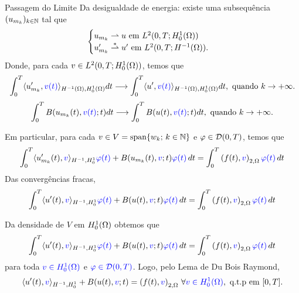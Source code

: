 \begin{frame}{Passagem do Limite}
Da desigualdade de energia: existe uma subsequência \((u_{m_k})_{k\in\mathbb{N}}\) tal que
\begin{equation*}
\begin{cases}
u_{m_k} \rightharpoonup u \text{ em } L^2(0,T;H_0^1(\Omega))\\
u_{m_k}' \stackrel{\ast}{\rightharpoonup} u' \text{ em } L^2(0,T;H^{-1}(\Omega)).\\
\end{cases}
\end{equation*}
Donde, para cada {\color{blue}\(v\in L^2(0,T;H_0^1(\Omega))\)}, temos que
\[
\int_0^T \langle u_{m_k}',{\color{blue}v(t)}\rangle_{H^{-1}(\Omega),H_0^1(\Omega)}dt \longrightarrow
\int_0^T \langle u',{\color{blue}v(t)}\rangle_{H^{-1}(\Omega),H_0^1(\Omega)}dt, \text{ quando } k\to +\infty.
\]
\[
\int_0^T B(u_{m_k}(t),{\color{blue}v(t)};t)dt \longrightarrow
\int_0^T B(u(t),{\color{blue}v(t)};t)dt, \text{ quando } k\to +\infty.
\]
\end{frame}
\begin{frame}{}
Em particular, para cada {\color{blue}\(v\in V=\operatorname{span}\{w_k;\, k\in \mathbb{N}\} \)} e {\color{blue}\(\varphi\in \mathcal{D}(0,T)\)}, 
temos que
\begin{equation*}
\int_0^T \langle u_{m_k}'(t),{\color{blue}v}\rangle_{H^{-1},H_0^1}{\color{blue}\varphi(t)} 
+ B(u_{m_k}(t),{\color{blue}v};t){\color{blue}\varphi(t)}\, dt
=\int_0^T \left(f(t),{\color{blue}v}\right)_{2,\Omega}{\color{blue}\varphi(t)}\,dt
\end{equation*}
Das convergências fracas,
\begin{equation*}
\int_0^T \langle u'(t),{\color{blue}v}\rangle_{H^{-1},H_0^1}{\color{blue}\varphi(t)} 
+ B(u(t),{\color{blue}v};t){\color{blue}\varphi(t)}\, dt
=\int_0^T \left(f(t),{\color{blue}v}\right)_{2,\Omega}{\color{blue}\varphi(t)}\,dt
\end{equation*}
\end{frame}
\begin{frame}{}
Da densidade de {\color{blue}\(V\) em \(H_0^1(\Omega)\)} obtemos que
\begin{equation*}
\int_0^T \langle u'(t),{\color{blue}v}\rangle_{H^{-1},H_0^1}{\color{red}{\color{blue}\varphi(t)}} 
+ B(u(t),{\color{blue}v};t){\color{blue}\varphi(t)}\, dt
=\int_0^T \left(f(t),{\color{blue}v}\right)_{2,\Omega}{\color{blue}\varphi(t)}\,dt
\end{equation*}
para toda \({\color{blue}v\in H_0^1(\Omega)}\) e \({\color{blue}\varphi\in \mathcal{D}(0,T)}\).
Logo, pelo {\color{red}Lema de Du Bois Raymond}, 
\begin{equation*}
\langle u'(t),{\color{blue}v}\rangle_{H^{-1},H_0^1}
+ B(u(t),{\color{blue}v};t)
=\left(f(t),{\color{blue}v}\right)_{2,\Omega}\, \forall {\color{blue}v\in H_0^1(\Omega)}, \text{ q.t.p em } [0,T].
\end{equation*}
\end{frame}

